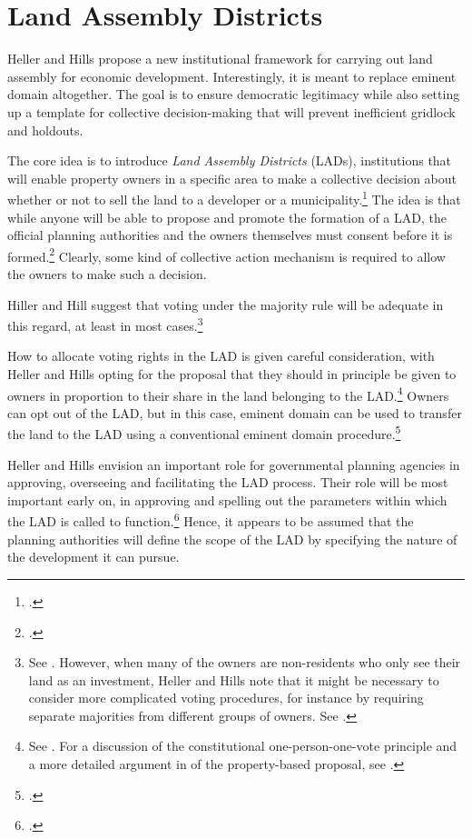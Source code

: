 \section{Land Assembly Districts}\label{sec:lad}

Heller and Hills propose a new institutional framework for carrying out land assembly for economic development. Interestingly, it is meant to replace eminent domain altogether. The goal is to ensure democratic legitimacy while also setting up a template for collective decision-making that will prevent inefficient gridlock and holdouts. 

The core idea is to introduce {\it Land Assembly Districts} (LADs), institutions that will enable property owners in a specific area to make a collective decision about whether or not to sell the land to a developer or a municipality.\footcite[1469-1470]{heller08} The idea is that while anyone will be able to propose and promote the formation of a LAD, the official planning authorities and the owners themselves must consent before it is formed.\footcite[1488-1489]{heller08} Clearly, some kind of collective action mechanism is required to allow the owners to make such a decision. 

Hiller and Hill suggest that voting under the majority rule will be adequate in this regard, at least in most cases.\footnote{See \cite[1496]{heller08}. However, when many of the owners are non-residents who only see their land as an investment, Heller and Hills note that it might be necessary to consider more complicated voting procedures, for instance by requiring separate majorities from different groups of owners. See \cite[1523-1524]{heller08}.} 

How to allocate voting rights in the LAD is given careful consideration, with Heller and Hills opting for the proposal that they should in principle be given to owners in proportion to their share in the land belonging to the LAD.\footnote{See \cite[1492]{heller08}. For a discussion of the constitutional one-person-one-vote principle and a more detailed argument in  of the property-based proposal, see \cite[1503-1507]{heller08}.} Owners can opt out of the LAD, but in this case, eminent domain can be used to transfer the land to the LAD using a conventional eminent domain procedure.\footcite[1496]{heller08}

Heller and Hills envision an important role for governmental planning agencies in approving, overseeing and facilitating the LAD process. Their role will be most important early on, in approving and spelling out the parameters within which the LAD is called to function.\footcite[1489-1491]{heller08} Hence, it appears to be assumed that the planning authorities will define the scope of the LAD by specifying the nature of the development it can pursue. 


